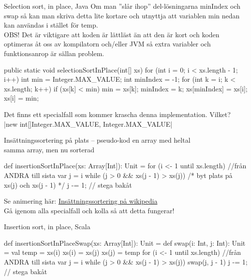 \begin{Slide}{Selection sort, in place, Java}\SlideFontTiny
Om man ''slår ihop'' del-lösningarna minIndex och swap så kan man skriva detta lite kortare och utnyttja att variablen min nedan kan användas i stället för temp.  \\
OBS! Det är viktigare att koden är lättläst än att den är kort och koden optimeras åt oss av kompilatorn och/eller JVM så extra variabler och funktionsanrop är sällan problem.
\begin{Code}[language=Java,basicstyle=\ttfamily\SlideFontSize{6}{7.5},numberstyle=\ttfamily\SlideFontSize{6}{8}, numbers=left]
public static void selectionSortInPlace(int[] xs) {
    for (int i = 0; i < xs.length - 1; i++) {
        int min = Integer.MAX_VALUE;
        int minIndex = -1;
        for (int k = i; k < xs.length; k++) {
            if (xs[k] < min) {
                min = xs[k];
                minIndex = k;
            }
        }
        xs[minIndex] = xs[i];
        xs[i] = min;
    }
}
\end{Code}


\pause Det finns ett specialfall som kommer krascha denna implementation. Vilket?
\pause\\\jcode|new int[]{Integer.MAX_VALUE, Integer.MAX_VALUE}|
\end{Slide}

\begin{Slide}{Insättningssortering på plats -- pseudo-kod}
 en array med heltal\\
 samma array, men nu sorterad\\
\begin{Code}
def insertionSortInPlace(xs: Array[Int]): Unit = {
  for (i <- 1 until xs.length) {  //från ANDRA till sista
    var j = i
    while (j > 0 && xs(j - 1) > xs(j)) {
      /* byt plats på xs(j) och xs(j - 1) */
      j -= 1;  // stega bakåt
    }
  }
}
\end{Code}
\pause
Se animering här: \href{https://sv.wikipedia.org/wiki/Ins\%C3\%A4ttningssortering}{Insättningssortering på wikipedia}\\
Gå igenom alla specialfall och kolla så att detta fungerar!
\end{Slide}

\begin{Slide}{Insertion sort, in place, Scala}
\begin{Code}
def insertionSortInPlaceSwap(xs: Array[Int]): Unit = {
  def swap(i: Int, j: Int): Unit = {
    val temp = xs(i)
    xs(i) = xs(j)
    xs(j) = temp
  }
  for (i <- 1 until xs.length) {  //från ANDRA till sista
    var j = i
    while (j > 0 && xs(j - 1) > xs(j)) {
      swap(j, j - 1)
      j -= 1;  // stega bakåt
    }
  }
}
\end{Code}
\end{Slide}


